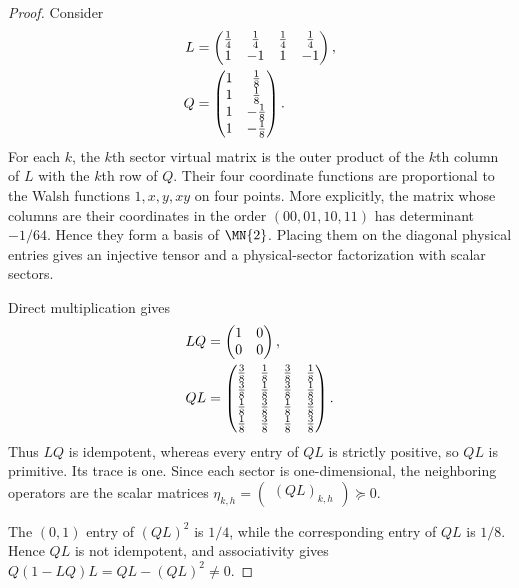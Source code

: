 \begin{proof}
    \leanok
    Consider
    \begin{align}
        L & =\begin{pmatrix}
                 \frac14 & \frac14 & \frac14 & \frac14 \\
                 1       & -1      & 1       & -1
             \end{pmatrix},
        \notag                                     \\
        Q & =\begin{pmatrix}
                 1 & \frac18  \\
                 1 & \frac18  \\
                 1 & -\frac18 \\
                 1 & -\frac18
             \end{pmatrix}.
        \notag
    \end{align}
    For each $k$, the $k$th sector virtual matrix is the outer product of the
    $k$th column of $L$ with the $k$th row of $Q$. Their four coordinate
    functions are proportional to the Walsh functions $1,x,y,xy$ on four
    points. More explicitly, the matrix whose columns are their coordinates
    in the order $(00,01,10,11)$ has determinant $-1/64$. Hence they form a
    basis of $\MN{2}$. Placing them on the
    diagonal physical entries gives an injective tensor and a physical-sector factorization with
    scalar sectors.

    Direct multiplication gives
    \begin{align}
        LQ
         & =\begin{pmatrix}
                1 & 0 \\
                0 & 0
            \end{pmatrix},
        \notag                                    \\
        QL
         & =\begin{pmatrix}
                \frac38 & \frac18 & \frac38 & \frac18 \\
                \frac38 & \frac18 & \frac38 & \frac18 \\
                \frac18 & \frac38 & \frac18 & \frac38 \\
                \frac18 & \frac38 & \frac18 & \frac38
            \end{pmatrix}.
        \notag
    \end{align}
    Thus $LQ$ is idempotent, whereas every entry of $QL$ is strictly positive,
    so $QL$ is primitive. Its trace is one. Since each sector is
    one-dimensional, the neighboring operators are the scalar matrices
    $\eta_{k,h}=\begin{pmatrix}(QL)_{k,h}\end{pmatrix}\succeq0$.

    The $(0,1)$ entry of $(QL)^2$ is $1/4$, while the corresponding entry of
    $QL$ is $1/8$. Hence $QL$ is not idempotent, and associativity gives
    $Q(1-LQ)L=QL-(QL)^2\ne0$.
\end{proof}

